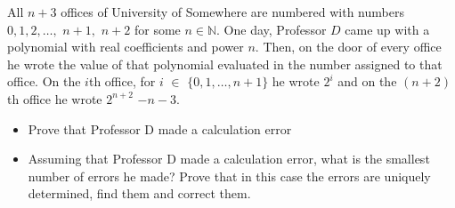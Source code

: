 All $n+3$ offices of University of Somewhere are numbered with numbers $0,1,2, \ldots ,$ $n+1,$ $n+2$ for some $n \in \mathbb{N}$. One day, Professor $D$ came up with a polynomial with real coefficients and power $n$. Then, on the door of every office he wrote the value of that polynomial evaluated in the number assigned to that office. On the $i$th office, for $i$ $\in$ $\{0,1, \ldots, n+1 \}$ he wrote $2^i$ and on the $(n+2)$th office he wrote $2^{n+2}$ $-n-3$.
\begin{itemize}
	\item Prove that Professor D made a calculation error
	\item Assuming that Professor D made a calculation error, what is the smallest number of errors he made? Prove that in this case the errors are uniquely determined, find them and correct them.
\end{itemize}
